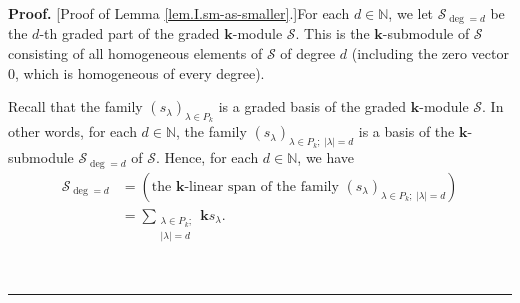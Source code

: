 \documentclass[numbers=enddot,12pt,final,onecolumn,notitlepage]{scrartcl}%
\theoremstyle{definition}
\newenvironment{proof}[1][Proof]{\noindent\textbf{#1.} }{\ \rule{0.5em}{0.5em}}
\let\sumnonlimits\sum
\renewcommand{\sum}{\sumnonlimits\limits}
\begin{document}
\begin{proof}
[Proof of Lemma \ref{lem.I.sm-as-smaller}.]For each $d\in\mathbb{N}$, we let
$\mathcal{S}_{\deg=d}$ be the $d$-th graded part of the graded $\mathbf{k}%
$-module $\mathcal{S}$. This is the $\mathbf{k}$-submodule of $\mathcal{S}$
consisting of all homogeneous elements of $\mathcal{S}$ of degree $d$
(including the zero vector $0$, which is homogeneous of every degree).

Recall that the family $\left(  s_{\lambda}\right)  _{\lambda\in P_{k}}$ is a
graded basis of the graded $\mathbf{k}$-module $\mathcal{S}$. In other words,
for each $d\in\mathbb{N}$, the family $\left(  s_{\lambda}\right)
_{\lambda\in P_{k};\ \left\vert \lambda\right\vert =d}$ is a basis of the
$\mathbf{k}$-submodule $\mathcal{S}_{\deg=d}$ of $\mathcal{S}$. Hence, for
each $d\in\mathbb{N}$, we have%
\begin{align}
\mathcal{S}_{\deg=d}  &  =\left(  \text{the }\mathbf{k}\text{-linear span of
the family }\left(  s_{\lambda}\right)  _{\lambda\in P_{k};\ \left\vert
\lambda\right\vert =d}\right) \nonumber\\
&  =\sum_{\substack{\lambda\in P_{k};\\\left\vert \lambda\right\vert
=d}}\mathbf{k}s_{\lambda}. \label{pf.lem.I.sm-as-smaller.2}%
\end{align}



\end{proof}
\end{document}
